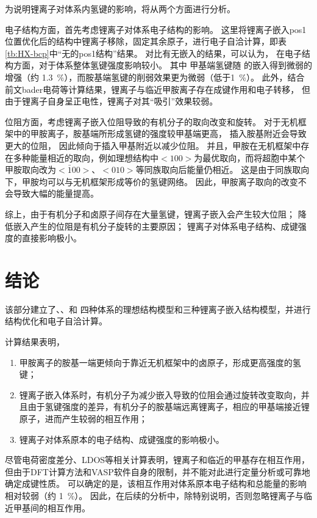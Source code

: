 为说明锂离子对体系内氢键的影响，将从两个方面进行分析。

电子结构方面，首先考虑锂离子对体系电子结构的影响。
这里将锂离子嵌入pos1位置优化后的结构中锂离子移除，固定其余原子，进行电子自洽计算，即表\ref{tb:HX-bcp}中“无的pos1结构”结果。
对比有无嵌入的结果，可以认为， 在电子结构方面，对于体系整体氢键强度影响较小。
其中 甲基端氢键随 的嵌入得到微弱的增强（约 \SI{1.3}{\percent}），而胺基端氢键的削弱效果更为微弱（低于\SI{1}{\percent}）。
此外，结合前文bader电荷等计算结果，锂离子与临近甲胺离子存在成键作用和电子转移，
但由于锂离子自身呈正电性，锂离子对其“吸引”效果较弱。

位阻方面，考虑锂离子嵌入位阻导致的有机分子的取向改变和旋转。
对于无机框架中的甲胺离子，胺基端所形成氢键的强度较甲基端更高，  插入胺基附近会导致更大的位阻， 因此倾向于插入甲基附近以减少位阻。
并且，甲胺在无机框架中存在多种能量相近的取向，例如理想结构中$<100>$为最优取向，而将超胞中某个甲胺取向改为$<\bar{1}00>$、$<010>$等同族取向后能量仍相近。
这是由于同族取向下，甲胺均可以与无机框架形成等价的氢键网络。
因此，甲胺离子取向的改变不会导致大幅的能量提高。

综上，由于有机分子和卤原子间存在大量氢键，锂离子嵌入会产生较大位阻；
降低嵌入产生的位阻是有机分子旋转的主要原因；
锂离子对体系电子结构、成键强度的直接影响极小。

\section{结论}

该部分建立了、、和 四种体系的理想结构模型和三种锂离子嵌入结构模型，并进行结构优化和电子自洽计算。

计算结果表明，
\begin{enumerate}
    \item 甲胺离子的胺基一端更倾向于靠近无机框架中的卤原子，形成更高强度的氢键；
    \item 锂离子嵌入体系时，有机分子为减少嵌入导致的位阻会通过旋转改变取向，并且由于氢键强度的差异，有机分子的胺基端远离锂离子，相应的甲基端接近锂原子，进而产生较弱的相互作用；
    \item 锂离子对体系原本的电子结构、成键强度的影响极小。   
\end{enumerate}

尽管电荷密度差分、LDOS等相关计算表明，锂离子和临近的甲基存在相互作用，
但由于DFT计算方法和VASP软件自身的限制，并不能对此进行定量分析或可靠地确定成键性质。
可以确定的是，该相互作用对体系原本电子结构和总能量的影响相对较弱（约 \SI{1}{\percent}）。
因此，在后续的分析中，除特别说明，否则忽略锂离子与临近甲基间的相互作用。

